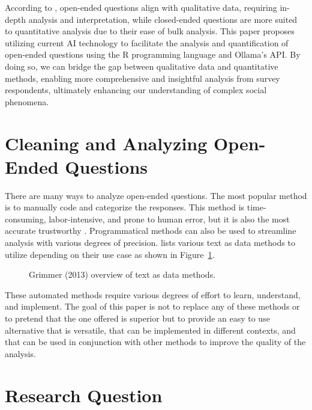 \documentclass[
  authoryear,
  preprint,
  3p]{elsarticle}
\begin{document}
According to \citet{bickman_rog09}, open-ended questions align with
qualitative data, requiring in-depth analysis and interpretation, while
closed-ended questions are more suited to quantitative analysis due to
their ease of bulk analysis. This paper proposes utilizing current AI
technology to facilitate the analysis and quantification of open-ended
questions using the R programming language and Ollama's API. By doing
so, we can bridge the gap between qualitative data and quantitative
methods, enabling more comprehensive and insightful analysis from survey
respondents, ultimately enhancing our understanding of complex social
phenomena.

\section{Cleaning and Analyzing Open-Ended
Questions}\label{cleaning-and-analyzing-open-ended-questions}

There are many ways to analyze open-ended questions. The most popular
method is to manually code and categorize the responses. This method is
time-consuming, labor-intensive, and prone to human error, but it is
also the most accurate trustworthy \citep{roberts_etal14}.
Programmatical methods can also be used to streamline analysis with
various degrees of precision. \citet{grimmer_etal13} lists various text
as data methods to utilize depending on their use case as shown in
Figure~\ref{fig-methods}.

\begin{figure}


\caption{\label{fig-methods}Grimmer (2013) overview of text as data
methods.}

\end{figure}%

These automated methods require various degrees of effort to learn,
understand, and implement. The goal of this paper is not to replace any
of these methods or to pretend that the one offered is superior but to
provide an easy to use alternative that is versatile, that can be
implemented in different contexts, and that can be used in conjunction
with other methods to improve the quality of the analysis.

\section{Research Question}\label{research-question}
\end{document}
